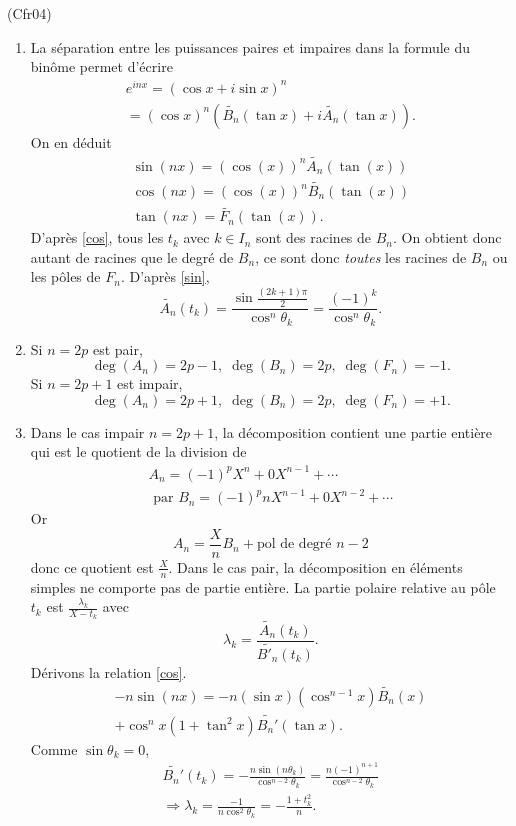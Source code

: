 \begin{tiny}(Cfr04)\end{tiny} 
\begin{enumerate}
 \item La séparation entre les puissances paires et impaires dans la formule du binôme permet d'écrire
\begin{multline*}
 e^{i n x} = \left( \cos x + i \sin x \right)^n \\
 = (\cos x )^n \left( \widetilde{B_n}(\tan x) + i\widetilde{A_n}(\tan x)  \right). 
\end{multline*}
On en déduit
\begin{align}
  \sin(nx) = (\cos(x))^n\widetilde{A_n}(\tan(x)) \label{sin} \\
  \cos(nx) = (\cos(x))^n\widetilde{B_n}(\tan(x)) \label{cos} \\
  \tan(nx) = \widetilde{F_n}(\tan(x)) \label{tan}.
\end{align}
D'après \ref{cos}, tous les $t_k$ avec $k\in I_n$ sont des racines de $B_n$. On obtient donc autant de racines que le degré de $B_n$, ce sont donc \emph{toutes} les racines de $B_n$ ou les pôles de $F_n$. D'après \ref{sin},
\[
\widetilde{A_n}(t_k) = \frac{\sin\frac{(2k+1)\pi}{2}}{\cos^n\theta_k}
= \frac{(-1)^k}{\cos^n\theta_k}.
\]

 \item Si $n=2p$ est pair, 
\[
\deg(A_n) = 2p-1, \; \deg(B_n) = 2p, \; \deg(F_n) = -1.  
\] 
Si $n=2p+1$ est impair, 
\[
\deg(A_n) = 2p+1, \; \deg(B_n) = 2p, \; \deg(F_n) = +1.  
\] 
 \item Dans le cas impair $n=2p+1$, la décomposition contient une partie entière qui est le quotient de la division de 
\begin{multline*}
A_n = (-1)^pX^n + 0X^{n-1} + \cdots \\
\text{ par }
B_n = (-1)^pnX^{n-1} + 0X^{n-2} + \cdots 
\end{multline*}
Or 
\[
 A_n = \frac{X}{n}B_n + \text{pol de degré $n-2$}
\]
donc ce quotient est $\frac{X}{n}$.\newline
Dans le cas pair, la décomposition en éléments simples ne comporte pas de partie entière.\newline
La partie polaire relative au pôle $t_k$ est $\frac{\lambda_k}{X-t_k}$ avec
\[
 \lambda_k = 
\frac{\widetilde{A_n}(t_k)}{\widetilde{B'_n}(t_k)}.
\]
Dérivons la relation \ref{cos}.
\begin{multline*}
 -n \sin(nx) = -n(\sin x)(\cos^{n-1}x) \widetilde{B_n}(x) \\
 + \cos^nx(1+\tan^2x)\widetilde{B_n'}(\tan x).
\end{multline*}
Comme $\sin \theta_k = 0$,
\begin{multline*}
\widetilde{B_n'}(t_k) = -\frac{n\sin(n\theta_k)}{\cos^{n-2}\theta_k}
= \frac{n(-1)^{n+1}}{\cos^{n-2}\theta_k}\\
\Rightarrow
\lambda_k = \frac{-1}{n\cos^2 \theta_k}
= - \frac{1+t_k^2}{n}.
\end{multline*}

\end{enumerate}
